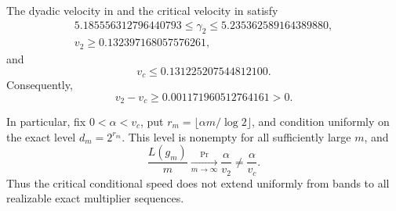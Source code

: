 \ifdefined\supplementonly
\begin{theorem}
\label{thm:strict-speed-separation}
The dyadic velocity in  and the critical
velocity in  satisfy
\begin{equation}
 \begin{gathered}
  5.185556312796440793\le\gamma_2
  \le5.235362589164389880,\\
  v_2\ge0.132397168057576261,
 \end{gathered}
 \label{eq:dyadic-speed-certificate}
\end{equation}
and
\begin{equation}
 v_c\le0.131225207544812100.
 \label{eq:critical-speed-certificate}
\end{equation}
Consequently,
\begin{equation}
 v_2-v_c\ge0.001171960512764161>0.
 \label{eq:strict-speed-separation}
\end{equation}

In particular, fix \(0<\alpha<v_c\), put
\(r_m=\lfloor\alpha m/\log2\rfloor\), and condition uniformly on the exact
level \(d_m=2^{r_m}\).  This level is nonempty for all sufficiently large
\(m\), and
\begin{equation}
 \frac{L(g_m)}m\xrightarrow[m\to\infty]{\Pr}
 \frac{\alpha}{v_2}\ne\frac{\alpha}{v_c}.
 \label{eq:dyadic-uniform-speed-counterexample}
\end{equation}
Thus the critical conditional speed does not extend uniformly from bands to
all realizable exact multiplier sequences.
\end{theorem}

